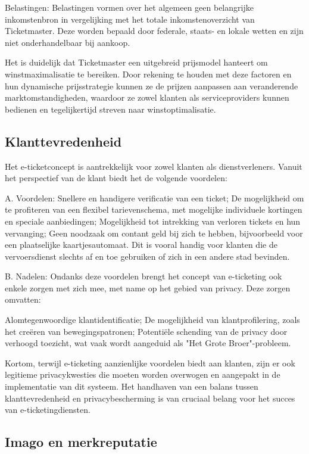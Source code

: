 Belastingen: Belastingen vormen over het algemeen geen belangrijke inkomstenbron in vergelijking met het totale inkomstenoverzicht van Ticketmaster. Deze worden bepaald door federale, staats- en lokale wetten en zijn niet onderhandelbaar bij aankoop.

\vspace{10 mm}

Het is duidelijk dat Ticketmaster een uitgebreid prijsmodel hanteert om winstmaximalisatie te bereiken. Door rekening te houden met deze factoren en hun dynamische prijsstrategie kunnen ze de prijzen aanpassen aan veranderende marktomstandigheden, waardoor ze zowel klanten als serviceproviders kunnen bedienen en tegelijkertijd streven naar winstoptimalisatie.

\subsection{Klanttevredenheid}

Het e-ticketconcept is aantrekkelijk voor zowel klanten als dienstverleners. Vanuit het perspectief van de klant biedt het de volgende voordelen:

A. Voordelen:
Snellere en handigere verificatie van een ticket;
De mogelijkheid om te profiteren van een flexibel tarievenschema, met mogelijke individuele kortingen en speciale aanbiedingen;
Mogelijkheid tot intrekking van verloren tickets en hun vervanging;
Geen noodzaak om contant geld bij zich te hebben, bijvoorbeeld voor een plaatselijke kaartjesautomaat. Dit is vooral handig voor klanten die de vervoersdienst slechts af en toe gebruiken of zich in een andere stad bevinden.

B. Nadelen:
Ondanks deze voordelen brengt het concept van e-ticketing ook enkele zorgen met zich mee, met name op het gebied van privacy. Deze zorgen omvatten:

Alomtegenwoordige klantidentificatie;
De mogelijkheid van klantprofilering, zoals het creëren van bewegingspatronen;
Potentiële schending van de privacy door verhoogd toezicht, wat vaak wordt aangeduid als "Het Grote Broer"-probleem.

Kortom, terwijl e-ticketing aanzienlijke voordelen biedt aan klanten, zijn er ook legitieme privacykwesties die moeten worden overwogen en aangepakt in de implementatie van dit systeem. Het handhaven van een balans tussen klanttevredenheid en privacybescherming is van cruciaal belang voor het succes van e-ticketingdiensten.

\subsection{Imago en merkreputatie}

